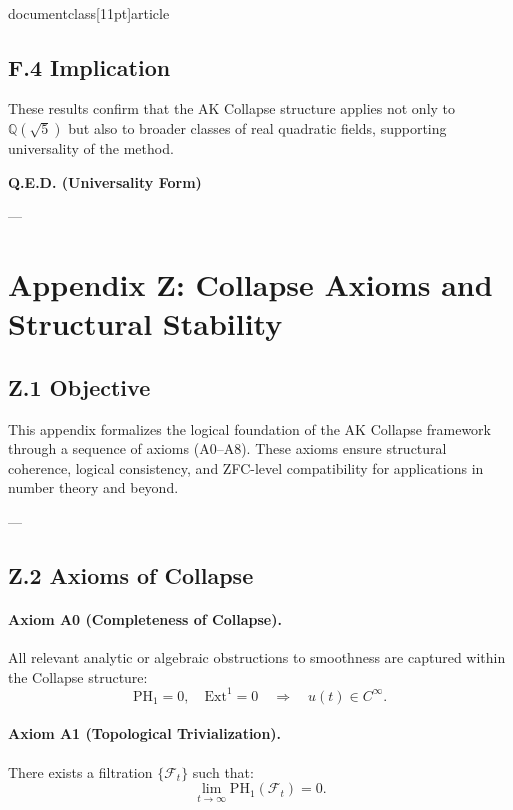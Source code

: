 \\documentclass[11pt]{article}
\begin{document}
\subsection*{F.4 Implication}

These results confirm that the AK Collapse structure applies not only to \( \mathbb{Q}(\sqrt{5}) \)  
but also to broader classes of real quadratic fields, supporting universality of the method.

\begin{center}
\LARGE \textbf{Q.E.D. (Universality Form)}
\end{center}


---


\section*{Appendix Z: Collapse Axioms and Structural Stability}

\subsection*{Z.1 Objective}

This appendix formalizes the logical foundation of the AK Collapse framework through a sequence of axioms (A0–A8).  
These axioms ensure structural coherence, logical consistency, and ZFC-level compatibility for applications in number theory and beyond.

---

\subsection*{Z.2 Axioms of Collapse}

\paragraph{Axiom A0 (Completeness of Collapse).}  
All relevant analytic or algebraic obstructions to smoothness are captured within the Collapse structure:
\[
\mathrm{PH}_1 = 0, \quad \mathrm{Ext}^1 = 0 \quad \Longrightarrow \quad u(t) \in C^\infty.
\]

\paragraph{Axiom A1 (Topological Trivialization).}  
There exists a filtration \( \{ \mathcal{F}_t \} \) such that:
\[
\lim_{t \to \infty} \mathrm{PH}_1(\mathcal{F}_t) = 0.
\]
\end{document}
